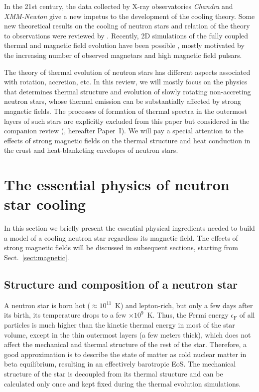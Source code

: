 \documentclass[smallextended]{svjour3}       %
\newcommand{\EF}{\epsilon_\mathrm{F}}
\begin{document}
In the 21st century, the data collected by X-ray
observatories \textit{Chandra} and \textit{XMM-Newton} give
a new impetus to the development of the cooling theory. Some
new theoretical results on the cooling of neutron stars and
relation of the theory to observations were reviewed by
\citet{Yakovlev-ea08,Page09,Tsuruta09}. Recently, 2D
simulations of  the fully coupled thermal and magnetic field
evolution have been possible \citep{PonsMG09,vigano13},
mostly motivated by the increasing number of observed
magnetars and high magnetic field pulsars.  

The theory of thermal evolution of neutron stars has
different aspects associated with rotation, accretion, etc. 
In this review, we will mostly focus on the physics that
determines thermal structure and evolution of  slowly
rotating non-accreting neutron stars, whose thermal emission
can be substantially affected by strong magnetic fields. 
The processes of formation of thermal spectra in the
outermost layers of such stars are explicitly excluded from
this paper but considered in the companion review
(\citealp*{NSemitters}, hereafter Paper~I). We will pay a
special attention to the effects of strong magnetic fields
on the thermal structure and heat conduction in the crust
and heat-blanketing envelopes of neutron stars. 


\section{The essential physics of neutron star cooling}
\label{sect:phys}

In this section we briefly present the essential physical
ingredients needed to build a model of a cooling neutron
star regardless its magnetic field. The effects of strong
magnetic fields will be discussed in subsequent sections,
starting from Sect.~\ref{sect:magnetic}.

\subsection{Structure and composition of a neutron star}
\label{sect:struct}

A neutron star is born hot ($\approx10^{11}$~K) and lepton-rich, but
only a few days after its birth, its temperature drops to a few $\times10^9$~K.
Thus,  the Fermi energy $\EF$ of all particles is much higher than the kinetic
thermal energy in most of the star volume, except in the thin outermost layers 
(a few meters thick), which does not affect the mechanical and
thermal structure of the rest of the star. Therefore,  a good
approximation is to describe the state of matter as cold nuclear matter in
beta equilibrium, resulting in an effectively barotropic EoS.
The mechanical structure of the star is decoupled from its
thermal structure and can be calculated only once and kept fixed during 
the thermal evolution simulations.
\end{document}
